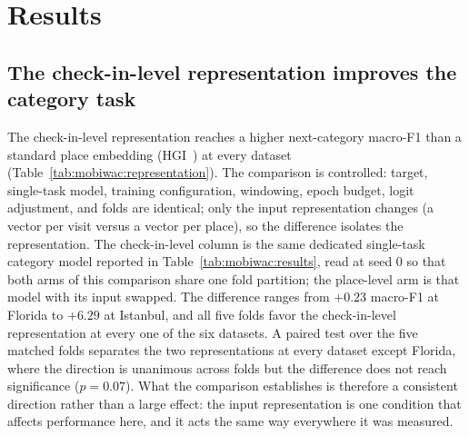 \section{Results}
\label{sec:mobiwac:results}

\subsection{The check-in-level representation improves the category task}
\label{sec:mobiwac:results-part1}
The check-in-level representation reaches a higher next-category macro-F1 than a standard place
embedding (HGI~\cite{huang2023hgi}) at every dataset
(Table~\ref{tab:mobiwac:representation}). The comparison is controlled: target, single-task model, training configuration, windowing, epoch budget, logit adjustment, and folds are identical; only the input representation changes (a vector per visit versus a vector per place), so the difference isolates the representation. The check-in-level column is the same dedicated single-task category model reported in Table~\ref{tab:mobiwac:results}, read at seed 0 so that both arms of this comparison share one fold partition; the place-level arm is that model with its input swapped. The difference ranges from $+0.23$ macro-F1 at Florida to
$+6.29$ at Istanbul, and all five folds favor the check-in-level representation at every one of the
six datasets. A paired test over the five matched folds separates the two representations at every
dataset except Florida, where the direction is unanimous across folds but the difference does not
reach significance ($p=0.07$). What the comparison establishes is therefore a consistent direction
rather than a large effect: the input representation is one condition that affects performance
here, and it acts the same way everywhere it was measured.

